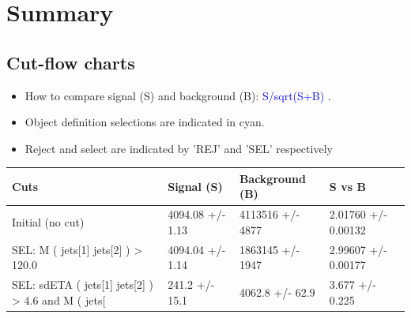 \documentclass[a4paper, 10pt]{article}
\begin{document}
\newpage
\section{ Summary}

\subsection{Cut-flow charts}

\begin{itemize}
  \item How to compare signal (S) and background (B): \textcolor{blue}{S/\-sqrt(S+B)} .
   \item Object definition selections are indicated in cyan.  \item Reject and select are indicated by 'REJ' and 'SEL' respectively
\end{itemize}
\begin{table}[H]
  \begin{center}
    \begin{tabular}{|m{36.0mm}|m{36.0mm}|m{36.0mm}|m{33.0mm}|}
      \hline
      {\cellcolor{yellow}        Cuts}& {\cellcolor{yellow}         Signal (S)}& {\cellcolor{yellow}         Background (B)}& {\cellcolor{yellow}         S vs B}\\
      \hline
      {\cellcolor{white}         Initial (no cut)}& {\cellcolor{white}         4094.08 +/\-- 1.13}& {\cellcolor{white}         4113516 +/\-- 4877}& {\cellcolor{white}         2.01760 +/\-- 0.00132}\\
      \hline
      {\cellcolor{white} SEL: M ( jets[1] jets[2] ) > 120.0}& {\cellcolor{white}         4094.04 +/\-- 1.14}& {\cellcolor{white}         1863145 +/\-- 1947}& {\cellcolor{white}         2.99607 +/\-- 0.00177}\\
      \hline
      {\cellcolor{white} SEL: sdETA ( jets[1] jets[2] ) > 4.6 and M ( jets[}& {\cellcolor{white}         241.2 +/\-- 15.1}& {\cellcolor{white}         4062.8 +/\-- 62.9}& {\cellcolor{white}         3.677 +/\-- 0.225}\\
\hline
    \end{tabular}
  \end{center}
\end{table}
\end{document}
